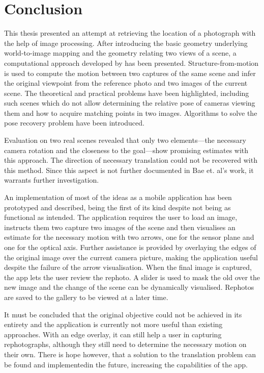 \chapter{Conclusion}

This thesis presented an attempt at retrieving the location of a photograph with
the help of image processing. After introducing the basic geometry underlying
world-to-image mapping and the geometry relating two views of a scene, a
computational approach developed by \citet{bae2010} has been presented.
Structure-from-motion is used to compute the motion between two captures of the
same scene and infer the original viewpoint from the reference photo and two
images of the current scene.  The theoretical and practical problems have been
highlighted, including such scenes which do not allow determining the relative
pose of cameras viewing them and how to acquire matching points in two images.
Algorithms to solve the pose recovery problem have been introduced.

Evaluation on two real scenes revealed that only two elements---the necessary
camera rotation and the closeness to the goal---show promising estimates with
this approach. The direction of necessary translation could not be recovered
with this method.  Since this
aspect is not further documented in Bae et. al's work, it warrants further
investigation.

An implementation of most of the ideas as a mobile application has been
prototyped and described, being the first of its kind despite not being as
functional as intended. The application requires the user to load an image,
instructs them two capture two images of the scene and then visualises an
estimate for the necessary motion with two arrows, one for the sensor plane and
one for the optical axis. Further assistance is provided by overlaying the edges
of the original image over the current camera picture, making the application
useful despite the failure of the arrow visualisation.  When the final image is
captured, the app lets the user review the rephoto. A slider is used to mask the
old over the new image and the change of the scene can be dynamically
visualised. Rephotos are saved to the gallery to be viewed at a later time.

It must be concluded that the original objective could not be achieved in its
entirety and
the application is currently not more useful than existing approaches. With an edge
overlay, it can still help a user in capturing rephotographs, although they
still need to determine the necessary motion on their own. There is hope
however, that a solution to the translation problem can be found and
implementedin the future, increasing the capabilities of the app.

